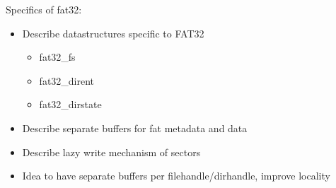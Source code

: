 Specifics of fat32:
\begin{itemize}
	\item Describe datastructures specific to FAT32
	\begin{itemize}
		\item fat32\_fs
		\item fat32\_dirent
		\item fat32\_dirstate
	\end{itemize}
	\item Describe separate buffers for fat metadata and data
	\item Describe lazy write mechanism of sectors
	\item Idea to have separate buffers per filehandle/dirhandle, improve locality
\end{itemize}
